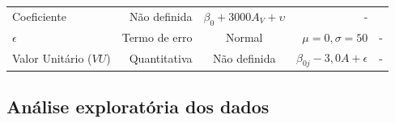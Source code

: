 \documentclass[
  a4paper, 12pt]{article}
\begin{document}
\begin{longtable}[]{@{}lrcrc@{}}
\begin{minipage}[t]{0.12\columnwidth}
Coeficiente\strut
\end{minipage} & \begin{minipage}[t]{0.11\columnwidth}\centering
Não definida\strut
\end{minipage} & \begin{minipage}[t]{0.25\columnwidth}\raggedleft
\(\beta_0 + 3000A_V + \upsilon\)\strut
\end{minipage} & \begin{minipage}[t]{0.21\columnwidth}\centering
-\strut
\end{minipage}\tabularnewline
\begin{minipage}[t]{0.18\columnwidth}\raggedright
\(\epsilon\)\strut
\end{minipage} & \begin{minipage}[t]{0.12\columnwidth}\raggedleft
Termo de erro\strut
\end{minipage} & \begin{minipage}[t]{0.11\columnwidth}\centering
Normal\strut
\end{minipage} & \begin{minipage}[t]{0.25\columnwidth}\raggedleft
\(\mu = 0, \sigma = 50\)\strut
\end{minipage} & \begin{minipage}[t]{0.21\columnwidth}\centering
-\strut
\end{minipage}\tabularnewline
\begin{minipage}[t]{0.18\columnwidth}\raggedright
Valor Unitário (\(VU\))\strut
\end{minipage} & \begin{minipage}[t]{0.12\columnwidth}\raggedleft
Quantitativa\strut
\end{minipage} & \begin{minipage}[t]{0.11\columnwidth}\centering
Não definida\strut
\end{minipage} & \begin{minipage}[t]{0.25\columnwidth}\raggedleft
\(\beta_{0j} - 3,0 A + \epsilon\)\strut
\end{minipage} & \begin{minipage}[t]{0.21\columnwidth}\centering
-\strut
\end{minipage}\tabularnewline
\bottomrule
\end{longtable}

\hypertarget{anuxe1lise-exploratuxf3ria-dos-dados}{%
\subsection{Análise exploratória dos
dados}\label{anuxe1lise-exploratuxf3ria-dos-dados}}
\end{document}

